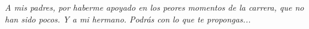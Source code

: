 
\thispagestyle{empty}
{}

\hfill
\vfill

\begin{flushright}
\itshape
A mis padres, por haberme apoyado en los peores momentos de la carrera, que no han sido pocos. Y a mi hermano. Podrás con lo que te propongas...
\end{flushright}

\vfill

\cleardoublepage
\endinput
